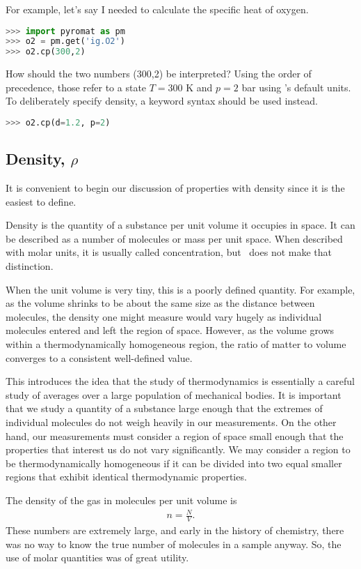 For example, let's say I needed to calculate the specific heat of oxygen.  

\begin{lstlisting}[language=Python]
>>> import pyromat as pm
>>> o2 = pm.get('ig.O2')
>>> o2.cp(300,2)
\end{lstlisting}

How should the two numbers (300,2) be interpreted?  Using the order of precedence, those refer to a state $T=300$ K and $p=2$ bar using \PM 's default units.  To deliberately specify density, a keyword syntax should be used instead.
\begin{lstlisting}[language=Python]
>>> o2.cp(d=1.2, p=2)
\end{lstlisting}

\subsection{Density, $\rho$}

It is convenient to begin our discussion of properties with density since it is the easiest to define.

Density is the quantity of a substance per unit volume it occupies in space.  It can be described as a number of molecules or mass per unit space.  When described with molar units, it is usually called concentration, but \PM\ does not make that distinction.

When the unit volume is very tiny, this is a poorly defined quantity.  For example, as the volume shrinks to be about the same size as the distance between molecules, the density one might measure would vary hugely as individual molecules entered and left the region of space.  However, as the volume grows within a thermodynamically homogeneous region, the ratio of matter to volume converges to a consistent well-defined value.

This introduces the idea that the study of thermodynamics is essentially a careful study of averages over a large population of mechanical bodies.  It is important that we study a quantity of a substance large enough that the extremes of individual molecules do not weigh heavily in our measurements.  On the other hand, our measurements must consider a region of space small enough that the properties that interest us do not vary significantly.  We may consider a region to be thermodynamically homogeneous if it can be divided into two equal smaller regions that exhibit identical thermodynamic properties.

The density of the gas in molecules per unit volume is
\begin{align}
n = \frac{N}{V}.
\end{align}
These numbers are extremely large, and early in the history of chemistry, there was no way to know the true number of molecules in a sample anyway.  So, the use of molar quantities was of great utility.

